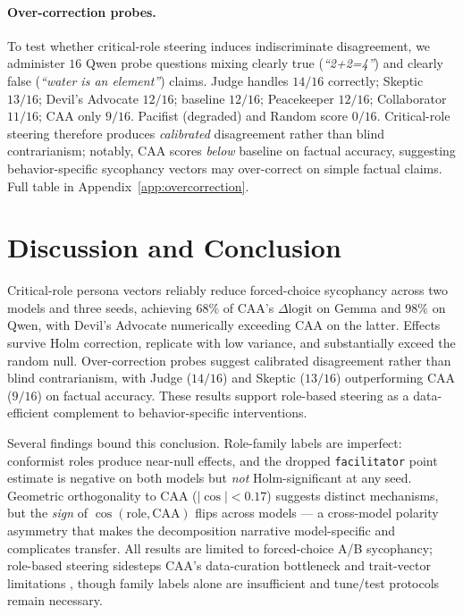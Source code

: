 \documentclass{article}
\theoremstyle{plain}
\theoremstyle{definition}
\theoremstyle{remark}
\begin{document}
\paragraph{Over-correction probes.}
To test whether critical-role steering induces indiscriminate disagreement, we administer $16$ Qwen probe questions mixing clearly true (\emph{``2+2=4''}) and clearly false (\emph{``water is an element''}) claims. Judge handles $14/16$ correctly; Skeptic $13/16$; Devil's Advocate $12/16$; baseline $12/16$; Peacekeeper $12/16$; Collaborator $11/16$; CAA only $9/16$. Pacifist (degraded) and Random score $0/16$. Critical-role steering therefore produces \emph{calibrated} disagreement rather than blind contrarianism; notably, CAA scores \emph{below} baseline on factual accuracy, suggesting behavior-specific sycophancy vectors may over-correct on simple factual claims. Full table in Appendix~\ref{app:overcorrection}.

\section{Discussion and Conclusion}

Critical-role persona vectors reliably reduce forced-choice sycophancy across two models and three seeds, achieving $68\%$ of CAA's $\Delta\mathrm{logit}$ on Gemma and $98\%$ on Qwen, with Devil's Advocate numerically exceeding CAA on the latter. Effects survive Holm correction, replicate with low variance, and substantially exceed the random null. Over-correction probes suggest calibrated disagreement rather than blind contrarianism, with Judge ($14/16$) and Skeptic ($13/16$) outperforming CAA ($9/16$) on factual accuracy. These results support role-based steering as a data-efficient complement to behavior-specific interventions.

Several findings bound this conclusion. Role-family labels are imperfect: conformist roles produce near-null effects, and the dropped \texttt{facilitator} point estimate is negative on both models but \emph{not} Holm-significant at any seed. Geometric orthogonality to CAA ($|\cos|<0.17$) suggests distinct mechanisms, but the \emph{sign} of $\cos(\text{role}, \mathrm{CAA})$ flips across models --- a cross-model polarity asymmetry that makes the decomposition narrative model-specific and complicates transfer. All results are limited to forced-choice A/B sycophancy; role-based steering sidesteps CAA's data-curation bottleneck \cite{rimsky2024} and trait-vector limitations \cite{zou2023}, though family labels alone are insufficient and tune/test protocols remain necessary.
\end{document}
